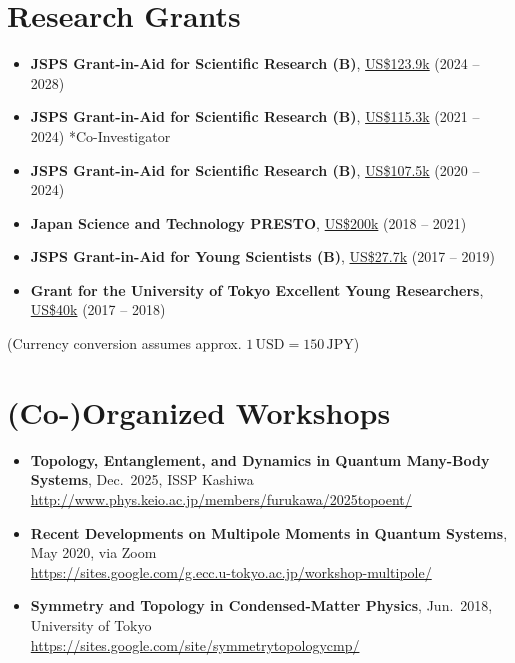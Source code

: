 \documentclass[letterpaper,11pt]{article}
\begin{document}
\section*{Research Grants}
\begin{itemize}[noitemsep, topsep=3pt]
    \item \textbf{JSPS Grant-in-Aid for Scientific Research (B)}, \underline{US\$123.9k} (2024 -- 2028)
    \item \textbf{JSPS Grant-in-Aid for Scientific Research (B)}, \underline{US\$115.3k} (2021 -- 2024) *Co-Investigator
    \item \textbf{JSPS Grant-in-Aid for Scientific Research (B)}, \underline{US\$107.5k} (2020 -- 2024)
    \item \textbf{Japan Science and Technology PRESTO}, \underline{US\$200k} (2018 -- 2021)
    \item \textbf{JSPS Grant-in-Aid for Young Scientists (B)}, \underline{US\$27.7k} (2017 -- 2019)
    \item \textbf{Grant for the University of Tokyo Excellent Young Researchers}, \underline{US\$40k} (2017 -- 2018)
\end{itemize}
{\footnotesize (Currency conversion assumes approx. $1\,\mathrm{USD} = 150\,\mathrm{JPY}$)}

\section*{(Co-)Organized Workshops}
\begin{itemize}[noitemsep, topsep=3pt]
    \item \textbf{Topology, Entanglement, and Dynamics in Quantum Many-Body Systems},
    Dec.\ 2025, ISSP Kashiwa\\
    \url{http://www.phys.keio.ac.jp/members/furukawa/2025topoent/}
    \item \textbf{Recent Developments on Multipole Moments in Quantum Systems},
    May 2020, via Zoom\\
    \url{https://sites.google.com/g.ecc.u-tokyo.ac.jp/workshop-multipole/}
    \item \textbf{Symmetry and Topology in Condensed-Matter Physics},
    Jun.\ 2018, University of Tokyo\\
    \url{https://sites.google.com/site/symmetrytopologycmp/}
\end{itemize}

\clearpage
\end{document}

